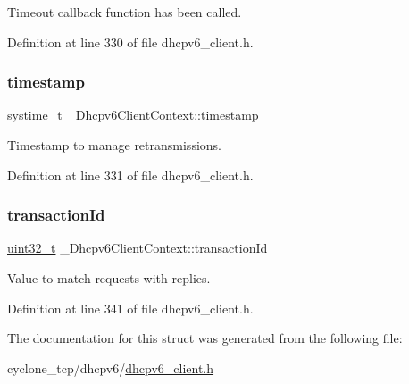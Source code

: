 Timeout callback function has been called. 



Definition at line 330 of file dhcpv6\+\_\+client.\+h.

\mbox{\label{struct__Dhcpv6ClientContext_a056d92033c7e833e88b8db808657f920}} 
\subsubsection{\texorpdfstring{timestamp}{timestamp}}
{\footnotesize\ttfamily \hyperlink{compiler__port_8h_ae3e32a98d431a02106616da3071832dd}{systime\+\_\+t} \+\_\+\+Dhcpv6\+Client\+Context\+::timestamp}



Timestamp to manage retransmissions. 



Definition at line 331 of file dhcpv6\+\_\+client.\+h.

\mbox{\label{struct__Dhcpv6ClientContext_aeba35c605008ddb9975b40cf96852ace}} 
\subsubsection{\texorpdfstring{transaction\+Id}{transactionId}}
{\footnotesize\ttfamily \hyperlink{stdint_8h_a435d1572bf3f880d55459d9805097f62}{uint32\+\_\+t} \+\_\+\+Dhcpv6\+Client\+Context\+::transaction\+Id}



Value to match requests with replies. 



Definition at line 341 of file dhcpv6\+\_\+client.\+h.



The documentation for this struct was generated from the following file\+:\begin{DoxyCompactItemize}
\item 
cyclone\+\_\+tcp/dhcpv6/\hyperlink{dhcpv6__client_8h}{dhcpv6\+\_\+client.\+h}\end{DoxyCompactItemize}
